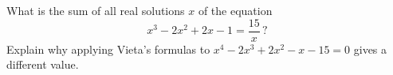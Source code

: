 What is the sum of all real solutions $x$ of the equation
\[x^3-2x^2+2x-1=\dfrac{15}{x}\,?\]
Explain why applying Vieta's formulas to $x^4-2x^3+2x^2-x-15=0$ gives a different value.
